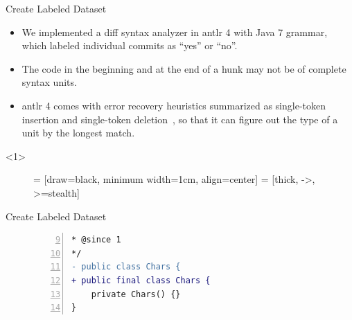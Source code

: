 \documentclass[xcolor=svgnames]{beamer}
\begin{document}
\begin{frame}[t]{Create Labeled Dataset}
\begin{itemize}
\item  We implemented a diff syntax analyzer in {\sc antlr} 4 with Java 7 grammar, which labeled individual commits as ``yes'' or ``no''.
\item<only@2-> The code in the beginning and at the end of a hunk may not be of complete syntax units.
\item<only@2-> {\sc antlr} 4 comes with error recovery heuristics summarized as single-token insertion and single-token deletion~\cite{parr2013definitive},
so that it can figure out the type of a unit by the longest match.
\end{itemize}

\begin{onlyenv}<1>
\begin{figure}
\centering
{} = [draw=black, minimum width=1cm, align=center]
 = [thick, ->, >=stealth]
\end{figure}
\end{onlyenv}

\end{frame}

\begin{frame}[fragile]{Create Labeled Dataset}

\begin{figure}
\begin{lstlisting}[language=diff, breaklines=true, numbers=left, xleftmargin=2em, firstnumber=9, escapechar=\%,]
%\tikz[style=target]{\node [anchor=base, yshift=0.2cm] (c) {}}%* @author Kevin Bourrillion
* @since 1
*/
- public class Chars {
+ public final class Chars {
    private Chars() {}
}
\end{lstlisting}
\end{figure}

\end{frame}
\end{document}
